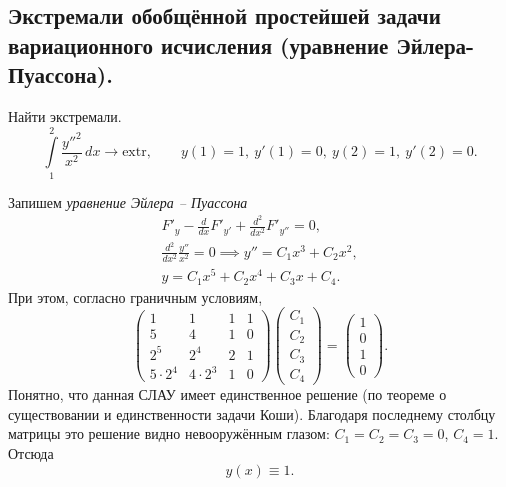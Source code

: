 \subsection{Экстремали обобщённой простейшей задачи вариационного исчисления (уравнение Эйлера-Пуассона).}
\begin{example}
  Найти экстремали. 
  \[
    \int\limits_{1}^{2} \frac{y''^2}{x^2}\,dx \to \mathrm{extr}, \qquad y(1)=1,\
    y'(1) = 0, \ y(2) = 1, \ y'(2) = 0.
  \]
  
\begin{solution}
  Запишем \emph{уравнение Эйлера -- Пуассона} 
  \begin{gather*}
    F'_y - \frac{d}{dx}F'_{y'} + \frac{d^2}{dx^2}F'_{y''} = 0,\\
    \frac{d^2}{dx^2} \frac{y''}{x^2} = 
    0 \implies y'' = C_1 x^3 + C_2 x^2,\\
    y = C_1x^5 + C_2 x^4 + C_3 x + C_4.
  \end{gather*}
При этом, согласно граничным условиям, 
\[
  \begin{pmatrix}
    1 & 1 & 1 & 1 \\
    5 & 4 & 1 & 0 \\
    2^5 & 2^4 & 2 & 1 \\
    5\cdot2^4 & 4\cdot2^3 & 1 & 0 
  \end{pmatrix}
  \begin{pmatrix}
    C_1 \\
    C_2 \\
    C_3 \\
    C_4
  \end{pmatrix} = 
  \begin{pmatrix}
    1 \\
    0 \\
    1 \\
    0
  \end{pmatrix}.
\]
Понятно, что данная СЛАУ имеет единственное решение (по теореме о существовании
и единственности задачи Коши). Благодаря последнему столбцу матрицы это решение
видно
невооружённым глазом: $ C_1 = C_2 = C_3 =0 $, $ C_4 = 1 $.
Отсюда  
\[
    \boxed{
      y(x) \equiv 1.
    }
\]
\end{solution}
\end{example}

